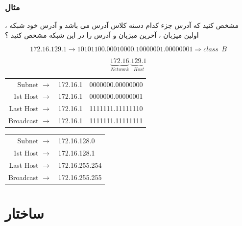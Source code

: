 \documentclass[12pt]{book}
\begin{document}
\newpage

\subsubsection{مثال}


 مشخص کنید که آدرس 
جزء کدام دسته کلاس آدرس می باشد و آدرس خود شبکه ، اولین میزبان ، آخرین میزبان و آدرس
 را در این شبکه مشخص کنید ؟


\begin{tcolorbox}
$$
172.16.129.1 \to 10101100.00010000.10000001.00000001 \Rightarrow class \:\: B
$$


$$
\underbrace{172.16}_{Network}.\underbrace{129.1}_{Host}
$$



\begin{latin}
\begin{center}
  \begin{tabular}{ r  r | l  }
    Subnet $\to$ & 172.16.1 & 0000000.00000000 \\
    1st Host $\to$ & 172.16.1 & 0000000.00000001 \\
    Last Host $\to$ & 172.16.1 & 1111111.11111110 \\
    Broadcast $\to$ & 172.16.1 & 1111111.11111111 \\
  \end{tabular}
\end{center}
\end{latin}



\begin{latin}
\begin{center}
  \begin{tabular}{ r  l   }
    Subnet $\to$ & 172.16.128.0  \\
    1st Host $\to$ & 172.16.128.1  \\
    Last Host $\to$ & 172.16.255.254 \\
    Broadcast $\to$ & 172.16.255.255 \\
  \end{tabular}
\end{center}
\end{latin}

\end{tcolorbox}




\newpage


\section{ساختار }
\end{document}
